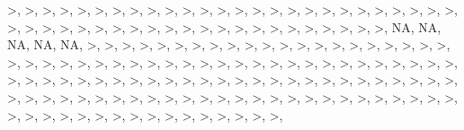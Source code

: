 \documentclass[12pt,]{article}
\begin{document}
\textgreater{}, \textgreater{}, \textgreater{}, \textgreater{},
\textgreater{}, \textgreater{}, \textgreater{}, \textgreater{},
\textgreater{}, \textgreater{}, \textgreater{}, \textgreater{},
\textgreater{}, \textgreater{}, \textgreater{}, \textgreater{},
\textgreater{}, \textgreater{}, \textgreater{}, \textgreater{},
\textgreater{}, \textgreater{}, \textgreater{}, \textgreater{},
\textgreater{}, \textgreater{}, \textgreater{}, \textgreater{},
\textgreater{}, \textgreater{}, \textgreater{}, \textgreater{},
\textgreater{}, \textgreater{}, \textgreater{}, \textgreater{},
\textgreater{}, \textgreater{}, \textgreater{}, \textgreater{},
\textgreater{}, \textgreater{}, \textgreater{}, \textgreater{},
\textgreater{}, \textgreater{}, \textgreater{}, \textgreater{}, NA, NA,
NA, NA, NA, \textgreater{}, \textgreater{}, \textgreater{},
\textgreater{}, \textgreater{}, \textgreater{}, \textgreater{},
\textgreater{}, \textgreater{}, \textgreater{}, \textgreater{},
\textgreater{}, \textgreater{}, \textgreater{}, \textgreater{},
\textgreater{}, \textgreater{}, \textgreater{}, \textgreater{},
\textgreater{}, \textgreater{}, \textgreater{}, \textgreater{},
\textgreater{}, \textgreater{}, \textgreater{}, \textgreater{},
\textgreater{}, \textgreater{}, \textgreater{}, \textgreater{},
\textgreater{}, \textgreater{}, \textgreater{}, \textgreater{},
\textgreater{}, \textgreater{}, \textgreater{}, \textgreater{},
\textgreater{}, \textgreater{}, \textgreater{}, \textgreater{},
\textgreater{}, \textgreater{}, \textgreater{}, \textgreater{},
\textgreater{}, \textgreater{}, \textgreater{}, \textgreater{},
\textgreater{}, \textgreater{}, \textgreater{}, \textgreater{},
\textgreater{}, \textgreater{}, \textgreater{}, \textgreater{},
\textgreater{}, \textgreater{}, \textgreater{}, \textgreater{},
\textgreater{}, \textgreater{}, \textgreater{}, \textgreater{},
\textgreater{}, \textgreater{}, \textgreater{}, \textgreater{},
\textgreater{}, \textgreater{}, \textgreater{}, \textgreater{},
\textgreater{}, \textgreater{}, \textgreater{}, \textgreater{},
\textgreater{}, \textgreater{}, \textgreater{}, \textgreater{},
\textgreater{}, \textgreater{}, \textgreater{}, \textgreater{},
\textgreater{}, \textgreater{}, \textgreater{}, \textgreater{},
\textgreater{}, \textgreater{}, \textgreater{}, \textgreater{},
\textgreater{}, \textgreater{}, \textgreater{}, \textgreater{},
\textgreater{}, \textgreater{}, \textgreater{}, \textgreater{},
\textgreater{}, \textgreater{}, \textgreater{}, \textgreater{},
\textgreater{}, \textgreater{}, \textgreater{}, \textgreater{},
\textgreater{}, \textgreater{}, \textgreater{}, \textgreater{},
\end{document}

